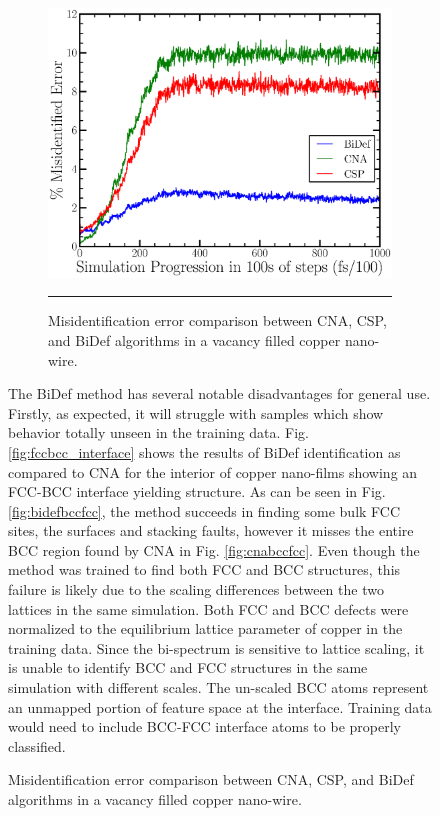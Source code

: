 \documentclass[12pt]{iopart}
\begin{document}
\begin{figure}[htbp]
\begin{figure}[htbp]
  \centering
    \includegraphics[scale=0.50]{Figures/vacancy_error.eps}
    \rule{35em}{0.5pt}
  \caption[]{Misidentification error comparison between CNA, CSP, and BiDef algorithms in a vacancy filled copper nano-wire.}
  \label{fig:errorvacancy}
\end{figure}

The BiDef method has several notable disadvantages for general use. Firstly, as expected, it will struggle with samples which show behavior totally unseen in the training data. Fig. \ref{fig:fccbcc_interface} shows the results of BiDef identification as compared to CNA for the interior of copper nano-films showing an FCC-BCC interface yielding structure. As can be seen in Fig. \ref{fig:bidefbccfcc}, the method succeeds in finding some bulk FCC sites, the surfaces and stacking faults, however it misses the entire BCC region found by CNA in Fig. \ref{fig:cnabccfcc}. Even though the method was trained to find both FCC and BCC structures, this failure is likely due to the scaling differences between the two lattices in the same simulation. Both FCC and BCC defects were normalized to the equilibrium lattice parameter of copper in the training data. Since the bi-spectrum is sensitive to lattice scaling, it is unable to identify BCC and FCC structures in the same simulation with different scales. The un-scaled BCC atoms represent an unmapped portion of feature space at the interface. Training data would need to include BCC-FCC interface atoms to be properly classified.


\end{figure}
\end{document}

